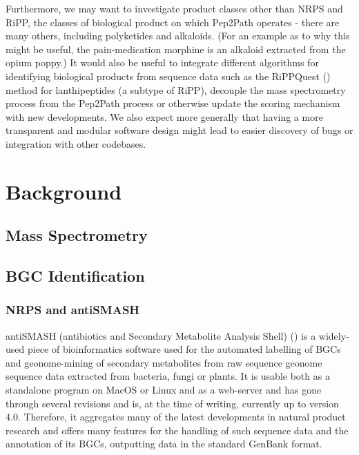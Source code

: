 \documentclass{l4proj}
\newcommand{\cit}[1]{(\cite{#1})}
\begin{document}
Furthermore, we may want to investigate product classes other than NRPS and RiPP, the classes of biological product on which Pep2Path operates - there are many others, including polyketides and alkaloids. (For an example as to why this might be useful, the pain-medication morphine is an alkaloid extracted from the opium poppy.) It would also be useful to integrate different algorithms for identifying biological products from sequence data such as the RiPPQuest \cit{rippq} method for lanthipeptides (a subtype of RiPP), decouple the mass spectrometry process from the Pep2Path process or otherwise update the scoring mechanism with new developments. We also expect more generally that having a more transparent and modular software design might lead to easier discovery of bugs or integration with other codebases.

\chapter{Background}

\section{Mass Spectrometry}

\section{BGC Identification}

\subsection{NRPS and antiSMASH}

antiSMASH (antibiotics and Secondary Metabolite Analysis Shell) \cit{as4} is a widely-used piece of bioinformatics software used for the automated labelling of BGCs and geonome-mining of secondary metabolites from raw sequence geonome sequence data extracted from bacteria, fungi or plants. It is usable both as a standalone program on MacOS or Linux and as a web-server and has gone through several revisions and is, at the time of writing, currently up to version 4.0. Therefore, it aggregates many of the latest developments in natural product research and offers many features for the handling of such sequence data and the annotation of its BGCs, outputting data in the standard GenBank format.
\end{document}

